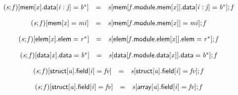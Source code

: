 $$
\begin{array}{@{}lcl@{}l@{}}
({\mathit{s}} ; {\mathit{f}}){}[\mathsf{mem}{}[{\mathit{x}}].\mathsf{data}{}[{\mathit{i}} : {\mathit{j}}] = {{\mathit{b}}^\ast}] &=& {\mathit{s}}{}[\mathsf{mem}{}[{\mathit{f}}.\mathsf{module}.\mathsf{mem}{}[{\mathit{x}}]].\mathsf{data}{}[{\mathit{i}} : {\mathit{j}}] = {{\mathit{b}}^\ast}] ; {\mathit{f}} &  \\
\end{array}
$$

$$
\begin{array}{@{}lcl@{}l@{}}
({\mathit{s}} ; {\mathit{f}}){}[\mathsf{mem}{}[{\mathit{x}}] = {\mathit{mi}}] &=& {\mathit{s}}{}[\mathsf{mem}{}[{\mathit{f}}.\mathsf{module}.\mathsf{mem}{}[{\mathit{x}}]] = {\mathit{mi}}] ; {\mathit{f}} &  \\
\end{array}
$$

$$
\begin{array}{@{}lcl@{}l@{}}
({\mathit{s}} ; {\mathit{f}}){}[\mathsf{elem}{}[{\mathit{x}}].\mathsf{elem} = {{\mathit{r}}^\ast}] &=& {\mathit{s}}{}[\mathsf{elem}{}[{\mathit{f}}.\mathsf{module}.\mathsf{elem}{}[{\mathit{x}}]].\mathsf{elem} = {{\mathit{r}}^\ast}] ; {\mathit{f}} &  \\
\end{array}
$$

$$
\begin{array}{@{}lcl@{}l@{}}
({\mathit{s}} ; {\mathit{f}}){}[\mathsf{data}{}[{\mathit{x}}].\mathsf{data} = {{\mathit{b}}^\ast}] &=& {\mathit{s}}{}[\mathsf{data}{}[{\mathit{f}}.\mathsf{module}.\mathsf{data}{}[{\mathit{x}}]].\mathsf{data} = {{\mathit{b}}^\ast}] ; {\mathit{f}} &  \\
\end{array}
$$

$$
\begin{array}{@{}lcl@{}l@{}}
({\mathit{s}} ; {\mathit{f}}){}[\mathsf{struct}{}[{\mathit{a}}].\mathsf{field}{}[{\mathit{i}}] = {\mathit{fv}}] &=& {\mathit{s}}{}[\mathsf{struct}{}[{\mathit{a}}].\mathsf{field}{}[{\mathit{i}}] = {\mathit{fv}}] ; {\mathit{f}} &  \\
\end{array}
$$

$$
\begin{array}{@{}lcl@{}l@{}}
({\mathit{s}} ; {\mathit{f}}){}[\mathsf{struct}{}[{\mathit{a}}].\mathsf{field}{}[{\mathit{i}}] = {\mathit{fv}}] &=& {\mathit{s}}{}[\mathsf{array}{}[{\mathit{a}}].\mathsf{field}{}[{\mathit{i}}] = {\mathit{fv}}] ; {\mathit{f}} &  \\
\end{array}
$$

